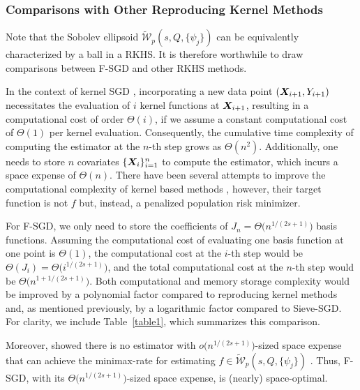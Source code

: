 \subsubsection{Comparisons with Other Reproducing Kernel Methods}\label{subsubsec:rkhs}
Note that the Sobolev ellipsoid $\tilde{\mathcal{W}}_p(s,Q, \{\psi_j\})$ can be equivalently characterized by a ball in a RKHS. It is therefore worthwhile to draw comparisons between F-SGD and other RKHS methods. 


In the context of kernel SGD \citep{4406a3ce-1e59-3ed8-8c25-9f7d75b81f14,6842642,article}, incorporating a new data point $(\bm{X}_{i+1}, Y_{i+1})$ necessitates the evaluation of $i$ kernel functions at $\bm{X}_{i+1}$, resulting in a computational cost of order $\Theta(i)$, if we assume a constant computational cost of $\Theta(1)$ per kernel evaluation. Consequently, the cumulative time complexity of computing the estimator at the $n$-th step grows as $\Theta(n^2)$. Additionally, one needs to store $n$ covariates $\{\bm{X}_i\}_{i=1}^n$ to compute the estimator, which incurs a space expense of $\Theta(n)$. There have been several attempts to improve the computational complexity of kernel based methods \citep{dai2014scalable,JMLR:v17:14-148,JMLR:v20:16-585}, however, their target function is not 
$f$ but, instead, a penalized population risk minimizer.
  
For F-SGD, we only need to store the coefficients of $J_n = \Theta\big(n^{1/(2s+1)}\big)$ basis functions. Assuming the computational cost of evaluating one basis function at one point is $\Theta(1)$, the computational cost at the $i$-th step would be $\Theta(J_i) = \Theta\big(i^{1/(2s+1)}\big)$, and the total computational cost at the $n$-th step would be $\Theta\big(n^{1+1/(2s+1)}\big)$. Both computational and memory storage complexity would be improved by a polynomial factor compared to reproducing kernel methods and, as mentioned previously, by a logarithmic factor compared to Sieve-SGD. For clarity, we include Table~\ref{table1}, which summarizes this comparison.

Moreover, \cite{zhang2022sieve} showed there is no estimator with $o\big(n^{1/(2s+1)}\big)$-sized space expense that can achieve the minimax-rate for estimating $f \in \tilde{\mathcal{W}}_p(s,Q, \{\psi_j\})$ \cite[Theorem 6.5]{zhang2022sieve}. Thus, F-SGD, with its $\Theta\big(n^{1/(2s+1)}\big)$-sized space expense, is (nearly) space-optimal.


